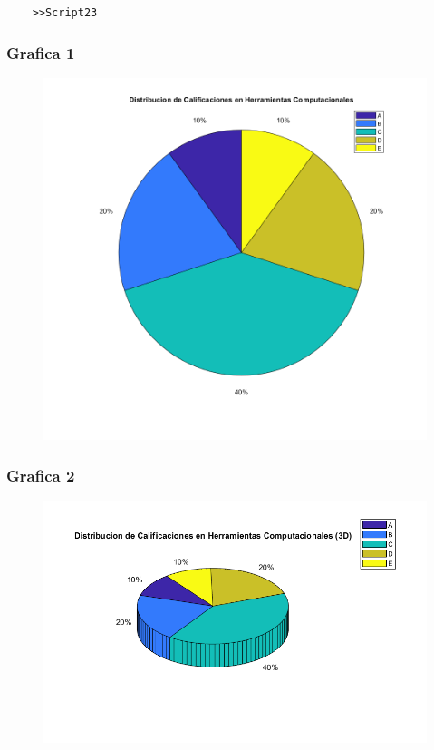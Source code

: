 \documentclass{article}
\begin{document}
	\begin{lstlisting}
	>>Script23
	\end{lstlisting}
	
	\newpage
	
	\subsubsection{Grafica 1}
	
	\begin{figure}[h]
		\centering
		\includegraphics[width=\textwidth]{grafica20a.png}
	\end{figure}
	
	\newpage
	
	\subsubsection{Grafica 2}
	
	\begin{figure}[h]
		\centering
		\includegraphics[width=\textwidth]{grafica20b.png}
	\end{figure}
	
\end{document}
